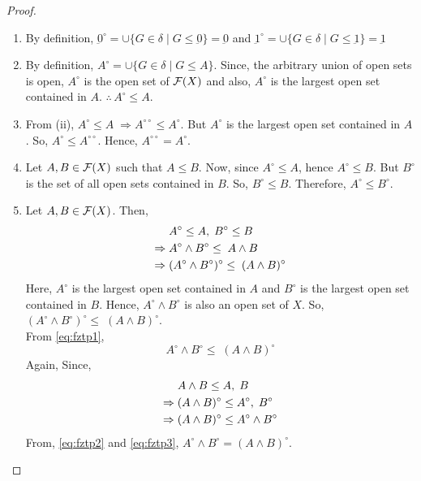 \documentclass[../main-sheet.tex]{subfiles}
\begin{document}
\begin{proof}\hfill
    \begin{enumerate}[label=(\roman*)]
        \item By definition, \(\underbar{0}^\circ=\cup\{G\in\delta \mid G\leq \underbar{0}\}=\underbar{0}   \) and \(\underbar{1}^\circ=\cup\{G\in\delta \mid G\leq \underbar{1}\}=\underbar{1}\)
        \item By definition, \(A^\circ=\cup\{G\in\delta \mid G\leq A\}\). Since, the arbitrary union of open sets is open, \(A^\circ\) is the open set of \(\mathcal{F}(X)\) and also, \(A^\circ\) is the largest open set contained in \(A \). \(\therefore\,A^\circ\leq A \).
        \item From (ii), \(A^\circ\leq A\;\Rightarrow A^{\circ\circ}\leq A^\circ\). But \(A^\circ\) is the largest open set contained in \(A \). So, \(A^\circ\leq A^{\circ\circ}\). Hence, \(A^{\circ\circ}=A^\circ\).
        \item Let \(A, B\in \mathcal{F}(X) \) such that \(A\leq B \). Now, since \(A^{\circ}\leq A\), hence \(A^\circ\leq B\). But \(B^\circ\) is the set of all open sets contained in \(B \). So, \(B^\circ\leq B \). Therefore, \(A^\circ\leq B^\circ\).
        \item Let \(A,B\in\mathcal{F}(X) \). Then, 
        \begin{align}
            &A^\circ\leq A,\;B^\circ\leq B\notag\\
            \Rightarrow\;&A^\circ\wedge B^\circ\leq\; A\wedge B\notag\\
            \Rightarrow\;&(A^\circ\wedge B^\circ)^\circ\leq\; (A\wedge B)^\circ\label{eq:fztp1}
        \end{align}
        Here, \(A^\circ\) is the largest open set contained in \(A \) and \(B^\circ\) is the largest open set contained in \(B \). Hence, \(A^\circ \wedge B^\circ\) is also an open set of \(X \). So, \((A^\circ\wedge B^\circ)^\circ\leq\; (A\wedge B)^\circ\).\\
        From \eqref{eq:fztp1},
        \begin{equation}
            A^\circ\wedge B^\circ \leq\; (A\wedge B)^\circ \label{eq:fztp2}
        \end{equation}
        Again, Since,
        \begin{align}
            &A\wedge B \leq A, \;B\notag\\
            \Rightarrow\;&(A\wedge B)^\circ \leq A^\circ, \;B^\circ\notag\\
            \Rightarrow\;&(A\wedge B)^\circ \leq A^\circ\wedge B^\circ\label{eq:fztp3}
        \end{align}
        From, \eqref{eq:fztp2} and \eqref{eq:fztp3}, \(A^\circ\wedge B^\circ=(A\wedge B)^\circ\).
    \end{enumerate}
\end{proof}
\end{document}
